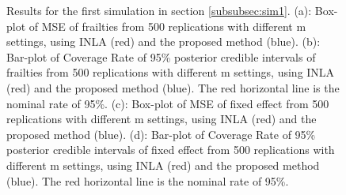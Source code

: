 \documentclass[ba]{imsart}
\begin{document}
\begin{figure}
\centering
{}
\caption{Results for the first simulation in section \ref{subsubsec:sim1}. (a): Box-plot of MSE of frailties from 500 replications with different m settings, using INLA (red) and the proposed method (blue). (b): Bar-plot of Coverage Rate of 95\% posterior credible intervals of frailties from 500 replications with different m settings, using INLA (red) and the proposed method (blue). The red horizontal line is the nominal rate of 95\%. (c): Box-plot of MSE of fixed effect from 500 replications with different m settings, using INLA (red) and the proposed method (blue). (d): Bar-plot of Coverage Rate of 95\% posterior credible intervals of fixed effect from 500 replications with different m settings, using INLA (red) and the proposed method (blue). The red horizontal line is the nominal rate of 95\%.  }
\label{fig:Sim1Plot}
\end{figure}
\end{document}
